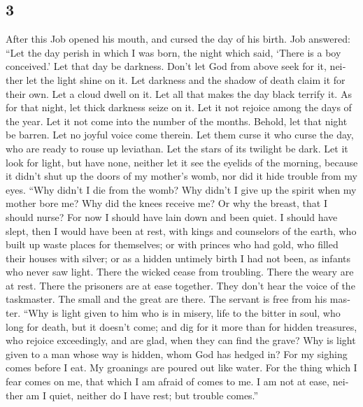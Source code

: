 \begin{paracol}{2}
\switchcolumn
\begin{otherlanguage}{english}

\hypertarget{section-5}{%
\section{3}\label{section-5}}

 After this Job opened his mouth, and cursed the day of
his birth.  Job answered:  ``Let the day
perish in which I was born, the night which said, `There is a boy
conceived.'  Let that day be darkness. Don't let God from
above seek for it, neither let the light shine on it.  Let
darkness and the shadow of death claim it for their own. Let a cloud
dwell on it. Let all that makes the day black terrify it. 
As for that night, let thick darkness seize on it. Let it not rejoice
among the days of the year. Let it not come into the number of the
months.  Behold, let that night be barren. Let no joyful
voice come therein.  Let them curse it who curse the day,
who are ready to rouse up leviathan.  Let the stars of its
twilight be dark. Let it look for light, but have none, neither let it
see the eyelids of the morning,  because it didn't shut
up the doors of my mother's womb, nor did it hide trouble from my eyes.
 ``Why didn't I die from the womb? Why didn't I give up
the spirit when my mother bore me?  Why did the knees
receive me? Or why the breast, that I should nurse?  For
now I should have lain down and been quiet. I should have slept, then I
would have been at rest,  with kings and counselors of
the earth, who built up waste places for themselves;  or
with princes who had gold, who filled their houses with silver;
 or as a hidden untimely birth I had not been, as infants
who never saw light.  There the wicked cease from
troubling. There the weary are at rest.  There the
prisoners are at ease together. They don't hear the voice of the
taskmaster.  The small and the great are there. The
servant is free from his master.  ``Why is light given to
him who is in misery, life to the bitter in soul,  who
long for death, but it doesn't come; and dig for it more than for hidden
treasures,  who rejoice exceedingly, and are glad, when
they can find the grave?  Why is light given to a man
whose way is hidden, whom God has hedged in?  For my
sighing comes before I eat. My groanings are poured out like water.
 For the thing which I fear comes on me, that which I am
afraid of comes to me.  I am not at ease, neither am I
quiet, neither do I have rest; but trouble comes.''


\end{otherlanguage}
\end{paracol}
